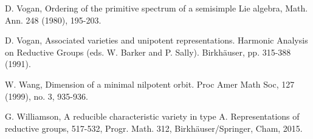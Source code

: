 \documentclass{amsart}[12pt]
\numberwithin{equation}{section}
\begin{document}
\begin{thebibliography}{99}
D. Vogan, Ordering of the primitive spectrum of a semisimple Lie  algebra, Math. Ann. 248 (1980), 195-203.
%
%
%





%
%
%
D. Vogan, Associated varieties and unipotent representations. Harmonic Analysis on
Reductive Groups (eds. W. Barker and P. Sally). Birkh\"{a}user, pp. 315-388
(1991).


W. Wang, Dimension of a minimal nilpotent orbit. Proc Amer Math Soc, 127 (1999), no. 3, 935-936.


G. Williamson, A reducible characteristic variety in type A. Representations of reductive groups, 517-532, Progr. Math. 312,  Birkh\"{a}user/Springer, Cham, 2015.


\end{thebibliography}
\end{document}
